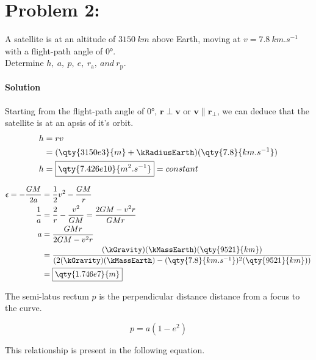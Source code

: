 \documentclass{article}
\begin{document}
{\begin{enumerate}
		
	
		
	
	\end{enumerate}
	
	\clearpage
	
	\section*{Problem 2: }
	A satellite is at an altitude of $\qty{3150}{km}$ above Earth, moving at $v=\qty{7.8}{km.s^{-1}}$ with a flight-path angle of $\ang{0}$. \\
	Determine $h,\ a,\ p,\ e,\ r_\mathrm{a},\ and \ r_\mathrm{p}$.
	\paragraph{Solution} Starting from the flight-path angle of $\ang{0}$, $\bm{r} \perp \bm{v}$ or $\bm{v} \parallel \bm{r}_\perp$, we can deduce that the satellite is at an apsis of it's orbit. \\
	\begin{equation*}
		\begin{split}
			h &= rv \\
			&= (\qty{3150e3}{m} + \kRadiusEarth)(\qty{7.8}{km.s^{-1}}) \\
			h &= \boxed{\qty{7.426e10}{m^2.s^{-1}}} = constant
		\end{split}
	\end{equation*}
	
	\begin{equation*}
		\begin{split}
			\epsilon = -\frac{GM}{2a} &= \frac{1}{2} v^2 - \frac{GM}{r} \\
			\frac{1}{a} &= \frac{2}{r} - \frac{v^2}{GM} = \frac{2GM - v^2 r}{GMr} \\
			a &= \frac{GMr}{2GM - v^2 r} \\
			&= \frac{(\kGravity)(\kMassEarth)(\qty{9521}{km})}{(2(\kGravity)(\kMassEarth)-(\qty{7.8}{km.s^{-1}})^2(\qty{9521}{km}))} \\
			&= \boxed{\qty{1.746e7}{m}}
		\end{split}
	\end{equation*}
	
	The semi-latus rectum $p$ is the perpendicular distance distance from a focus to the curve.
	
	\[
		p = a(1-e^2)
	\]
	
	This relationship is present in the following equation.
	
}
\end{document}
